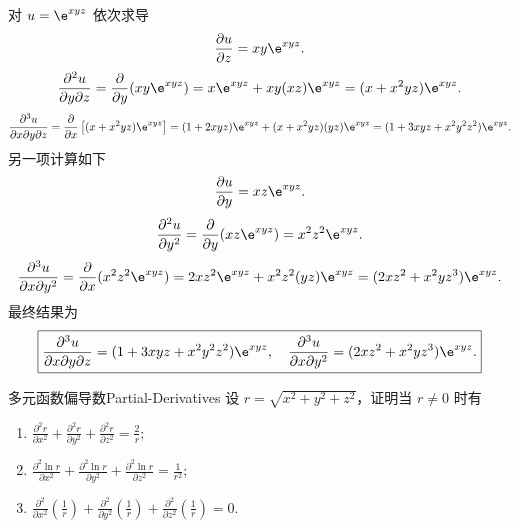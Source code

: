 \begin{solution}
    对 $u = \e^{xyz}$ 依次求导
    \begin{equation}
        \frac{\partial u}{\partial z} = xy \e^{xyz}.
    \end{equation}
    \begin{equation}
        \frac{\partial^{2} u}{\partial y \partial z} = \frac{\partial}{\partial y} (xy \e^{xyz}) = x \e^{xyz} + xy(xz) \e^{xyz} = (x + x^{2}yz) \e^{xyz}.
    \end{equation}
    \begin{equation}
        \frac{\partial^{3} u}{\partial x \partial y \partial z} = \frac{\partial}{\partial x} \left[ (x + x^{2}yz) \e^{xyz} \right] = (1 + 2xyz) \e^{xyz} + (x + x^{2}yz)(yz) \e^{xyz} = (1 + 3xyz + x^{2}y^{2}z^{2}) \e^{xyz}.
    \end{equation}
    另一项计算如下
    \begin{equation}
        \frac{\partial u}{\partial y} = xz \e^{xyz}.
    \end{equation}
    \begin{equation}
        \frac{\partial^{2} u}{\partial y^{2}} = \frac{\partial}{\partial y} (xz \e^{xyz}) = x^{2}z^{2} \e^{xyz}.
    \end{equation}
    \begin{equation}
        \frac{\partial^{3} u}{\partial x \partial y^{2}} = \frac{\partial}{\partial x} (x^{2}z^{2} \e^{xyz}) = 2xz^{2} \e^{xyz} + x^{2}z^{2}(yz) \e^{xyz} = (2xz^{2} + x^{2}yz^{3}) \e^{xyz}.
    \end{equation}
    最终结果为
    \begin{equation}
        \boxed{\frac{\partial^{3} u}{\partial x \partial y \partial z} = (1 + 3xyz + x^{2}y^{2}z^{2}) \e^{xyz}, \quad \frac{\partial^{3} u}{\partial x \partial y^{2}} = (2xz^{2} + x^{2}yz^{3}) \e^{xyz}.}
    \end{equation}
\end{solution}


\begin{problem}{多元函数偏导数}{Partial-Derivatives}
    设 $r = \sqrt{x^2 + y^2 + z^2}$，证明当 $r \neq 0$ 时有
    \begin{enumerate}
        \item $\frac{\partial^2 r}{\partial x^2} + \frac{\partial^2 r}{\partial y^2} + \frac{\partial^2 r}{\partial z^2} = \frac{2}{r};$
        \item $\frac{\partial^2 \ln r}{\partial x^2} + \frac{\partial^2 \ln r}{\partial y^2} + \frac{\partial^2 \ln r}{\partial z^2} = \frac{1}{r^2};$
        \item $\frac{\partial^2}{\partial x^2} \left( \frac{1}{r} \right) + \frac{\partial^2}{\partial y^2} \left( \frac{1}{r} \right) + \frac{\partial^2}{\partial z^2} \left( \frac{1}{r} \right) = 0.$
    \end{enumerate}
\end{problem}

